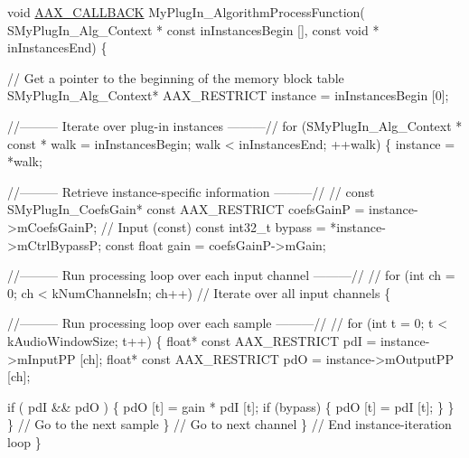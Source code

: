 \begin{DoxyCode}
\textcolor{keywordtype}{void} \hyperlink{a00149_aaa22112139aa627574b1ef562f579d43}{AAX\_CALLBACK} MyPlugIn\_AlgorithmProcessFunction(
    SMyPlugIn\_Alg\_Context * \textcolor{keyword}{const}   inInstancesBegin [],
    \textcolor{keyword}{const} \textcolor{keywordtype}{void} *                    inInstancesEnd)
    \{

        \textcolor{comment}{// Get a pointer to the beginning of the memory block table}
        SMyPlugIn\_Alg\_Context* AAX\_RESTRICT instance = inInstancesBegin [0];

        \textcolor{comment}{//--------- Iterate over plug-in instances ---------//}
        \textcolor{keywordflow}{for} (SMyPlugIn\_Alg\_Context * \textcolor{keyword}{const} * walk = inInstancesBegin; walk < inInstancesEnd; ++walk)
        \{
            instance = *walk;

            \textcolor{comment}{//--------- Retrieve instance-specific information ---------//}
            \textcolor{comment}{//}
            \textcolor{keyword}{const} SMyPlugIn\_CoefsGain* \textcolor{keyword}{const} AAX\_RESTRICT   coefsGainP =    instance->mCoefsGainP;  \textcolor{comment}{//
       Input (const)}
            \textcolor{keyword}{const} int32\_t   bypass      = *instance->mCtrlBypassP; 
            \textcolor{keyword}{const} \textcolor{keywordtype}{float}     gain        = coefsGainP->mGain;

            \textcolor{comment}{//--------- Run processing loop over each input channel ---------//}
            \textcolor{comment}{//}
            \textcolor{keywordflow}{for} (\textcolor{keywordtype}{int} ch = 0; ch < kNumChannelsIn; ch++) \textcolor{comment}{// Iterate over all input channels}
            \{

                \textcolor{comment}{//--------- Run processing loop over each sample ---------//}
                \textcolor{comment}{//}
                \textcolor{keywordflow}{for} (\textcolor{keywordtype}{int} t = 0; t < kAudioWindowSize; t++)
                \{
                    \textcolor{keywordtype}{float}* \textcolor{keyword}{const} AAX\_RESTRICT pdI = instance->mInputPP [ch];
                    \textcolor{keywordtype}{float}* \textcolor{keyword}{const} AAX\_RESTRICT pdO = instance->mOutputPP [ch];

                    \textcolor{keywordflow}{if} ( pdI && pdO )
                    \{
                        pdO [t] = gain * pdI [t];
                        \textcolor{keywordflow}{if} (bypass) \{ pdO [t] = pdI [t]; \} 
                    \}
                \} \textcolor{comment}{// Go to the next sample}
            \} \textcolor{comment}{// Go to next channel}
        \} \textcolor{comment}{// End instance-iteration loop}
    \}
\end{DoxyCode}




